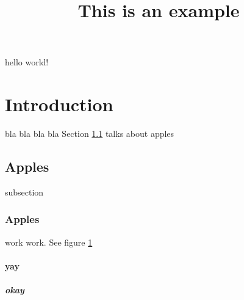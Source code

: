\documentclass{article}
\title{This is an example}
\begin{document}
\maketitle
\tableofcontents
hello world!

\section{Introduction} 
bla bla bla bla Section \ref{sec:apple} talks about apples

\subsection{Apples}
\label{sec:apple}
subsection

\subsubsection{Apples}
work work. See figure \ref{fig:test}
\begin{figure}
    \label{fig:test}
\end{figure}


\paragraph{yay}


\subparagraph{okay}
\end{document}
